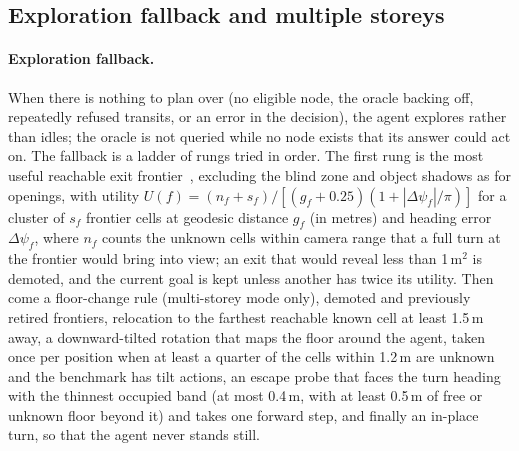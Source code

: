 \documentclass[10pt]{article}
\begin{document}
\subsection{Exploration fallback and multiple storeys}
\label{sec:planning-fallback}

\paragraph{Exploration fallback.} When there is nothing to plan over (no eligible node, the oracle backing off, repeatedly refused transits, or an error in the decision), the agent explores rather than idles; the oracle is not queried while no node exists that its answer could act on. The fallback is a ladder of rungs tried in order. The first rung is the most useful reachable exit frontier~\citep{yamauchi1997frontier}, excluding the blind zone and object shadows as for openings, with utility $U(f)=(n_f+s_f)/[(g_f+0.25)(1+|\Delta\psi_f|/\pi)]$ for a cluster of $s_f$ frontier cells at geodesic distance $g_f$ (in metres) and heading error $\Delta\psi_f$, where $n_f$ counts the unknown cells within camera range that a full turn at the frontier would bring into view; an exit that would reveal less than 1\,m$^2$ is demoted, and the current goal is kept unless another has twice its utility. Then come a floor-change rule (multi-storey mode only), demoted and previously retired frontiers, relocation to the farthest reachable known cell at least 1.5\,m away, a downward-tilted rotation that maps the floor around the agent, taken once per position when at least a quarter of the cells within 1.2\,m are unknown and the benchmark has tilt actions, an escape probe that faces the turn heading with the thinnest occupied band (at most 0.4\,m, with at least 0.5\,m of free or unknown floor beyond it) and takes one forward step, and finally an in-place turn, so that the agent never stands still.
\end{document}
